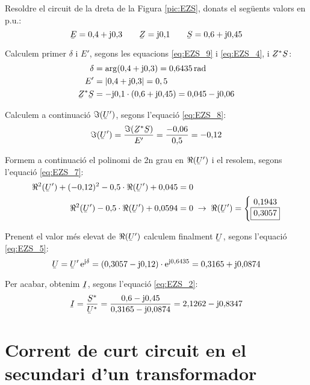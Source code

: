 \begin{exemple}
Resoldre el circuit de la dreta de la Figura \vref{pic:EZS}, donats el seg\"{u}ents valors en p.u.:
\[
   \cmplx{E} = 0{,}4 + \ju 0{,}3 \qquad \cmplx{Z} = \ju 0{,}1 \qquad
   \cmplx{S} = 0{,}6 + \ju 0{,}45
\]

Calculem primer $\delta$ i $E'$, segons les equacions \eqref{eq:EZS_9} i \eqref{eq:EZS_4},
i $\cmplx{Z}^* \cmplx{S}$:
\begin{align*}
   \delta &= \arg(0{,}4 + \ju 0{,}3) = 0{,}6435\unit{rad} \\
   E' &= |0{,}4 + \ju 0{,}3| = 0{,5} \\
   \cmplx{Z}^* \cmplx{S} &= - \ju 0{,}1 \cdot (0{,}6 + \ju 0{,}45) = 0{,}045 - \ju 0{,}06
\end{align*}

Calculem a continuaci\'{o} $\Im(\cmplx{U}')$, segons l'equaci\'{o} \eqref{eq:EZS_8}:
\[
   \Im(\cmplx{U}') = \frac{\Im(\cmplx{Z}^* \cmplx{S})}{E'} = \frac{-0{,}06}{0{,}5} = -0{,}12
\]

Formem a continuaci\'{o} el polinomi de 2n grau en $\Re(\cmplx{U}')$ i el resolem, segons l'equaci\'{o} \eqref{eq:EZS_7}:
\begin{align*}
   \Re^2(\cmplx{U}') + (-0{,}12)^2 - 0{,}5 \cdot \Re(\cmplx{U}') + 0{,}045 &= 0 \\
   \Re^2(\cmplx{U}') - 0{,}5 \cdot \Re(\cmplx{U}') + 0{,}0594 &= 0  \;\rightarrow\; \Re(\cmplx{U}') =
   \left\{ \begin{matrix}
     0{,}1943 \\
     \boxed{0{,}3057}
   \end{matrix}
   \right.
\end{align*}

Prenent el valor m\'{e}s elevat de $\Re(\cmplx{U}')$ calculem finalment $\cmplx{U}$, segons l'equaci\'{o} \eqref{eq:EZS_5}:
\[
   \cmplx{U} = \cmplx{U}' \, \eu^{\ju \delta} = (0{,}3057 - \ju 0{,}12) \cdot \eu^{\ju 0{,}6435} =
   0{,}3165 + \ju 0{,}0874
\]

Per acabar, obtenim $\cmplx{I}$, segons l'equaci\'{o} \eqref{eq:EZS_2}:
\[
   \cmplx{I} = \frac{\cmplx{S}^*}{\cmplx{U}^*} = \frac{0{,}6-\ju 0{,}45}{0{,}3165 - \ju 0{,}0874}
   = 2{,}1262 - \ju 0{,}8347
\]

\end{exemple}



\section{Corrent de curt circuit en el  secundari d'un transformador}

